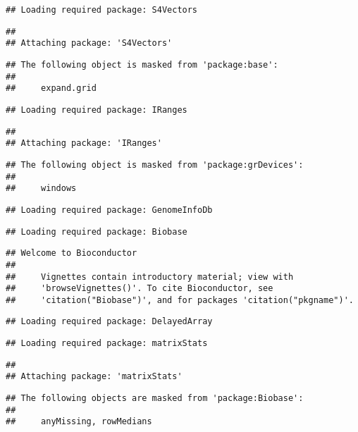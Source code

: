\documentclass[]{article}
\begin{document}
\begin{verbatim}
## Loading required package: S4Vectors
\end{verbatim}

\begin{verbatim}
## 
## Attaching package: 'S4Vectors'
\end{verbatim}

\begin{verbatim}
## The following object is masked from 'package:base':
## 
##     expand.grid
\end{verbatim}

\begin{verbatim}
## Loading required package: IRanges
\end{verbatim}

\begin{verbatim}
## 
## Attaching package: 'IRanges'
\end{verbatim}

\begin{verbatim}
## The following object is masked from 'package:grDevices':
## 
##     windows
\end{verbatim}

\begin{verbatim}
## Loading required package: GenomeInfoDb
\end{verbatim}

\begin{verbatim}
## Loading required package: Biobase
\end{verbatim}

\begin{verbatim}
## Welcome to Bioconductor
## 
##     Vignettes contain introductory material; view with
##     'browseVignettes()'. To cite Bioconductor, see
##     'citation("Biobase")', and for packages 'citation("pkgname")'.
\end{verbatim}

\begin{verbatim}
## Loading required package: DelayedArray
\end{verbatim}

\begin{verbatim}
## Loading required package: matrixStats
\end{verbatim}

\begin{verbatim}
## 
## Attaching package: 'matrixStats'
\end{verbatim}

\begin{verbatim}
## The following objects are masked from 'package:Biobase':
## 
##     anyMissing, rowMedians
\end{verbatim}
\end{document}
